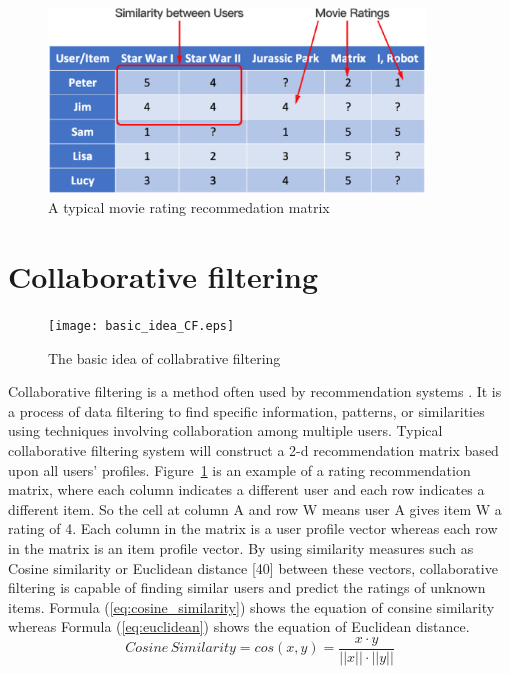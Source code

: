\begin{figure}[tbp]
 \begin{center}
  \includegraphics[width=100mm]{movie_matrix.eps}
 \end{center}
 \caption{\label{figure:rating_matrix} A typical movie rating recommedation matrix}
\end{figure}

\section{Collaborative filtering}

\begin{figure}[tbp]
 \begin{center}
  \texttt{[image: basic\_idea\_CF.eps]}
 \end{center}
 \caption{\label{figure:collabrative_filering_explain} The basic idea of collabrative filtering}
\end{figure}

Collaborative filtering is a method often used by recommendation systems \cite{Ricci2011}. It is a process of data filtering to find specific information, patterns, or similarities using techniques involving collaboration among multiple users. Typical collaborative filtering system will construct a 2-d recommendation matrix based upon all users' profiles. Figure~\ref{figure:rating_matrix} is an example of a rating recommendation matrix, where each column indicates a different user and each row indicates a different item. So the cell at column A and row W means user A gives item W a rating of 4. Each column in the matrix is a user profile vector whereas each row in the matrix is an item profile vector. By using similarity measures such as Cosine similarity or Euclidean distance [40] between these vectors, collaborative filtering is capable of finding similar users and predict the ratings of unknown items. 
Formula (\ref{eq:cosine_similarity}) shows the equation of consine similarity whereas Formula (\ref{eq:euclidean}) shows the equation of Euclidean distance.
\begin{equation}\label{eq:cosine_similarity}
  Cosine \, Similarity = cos(x, y) = \frac{x \cdot y}{||x|| \cdot ||y||}
\end{equation}

